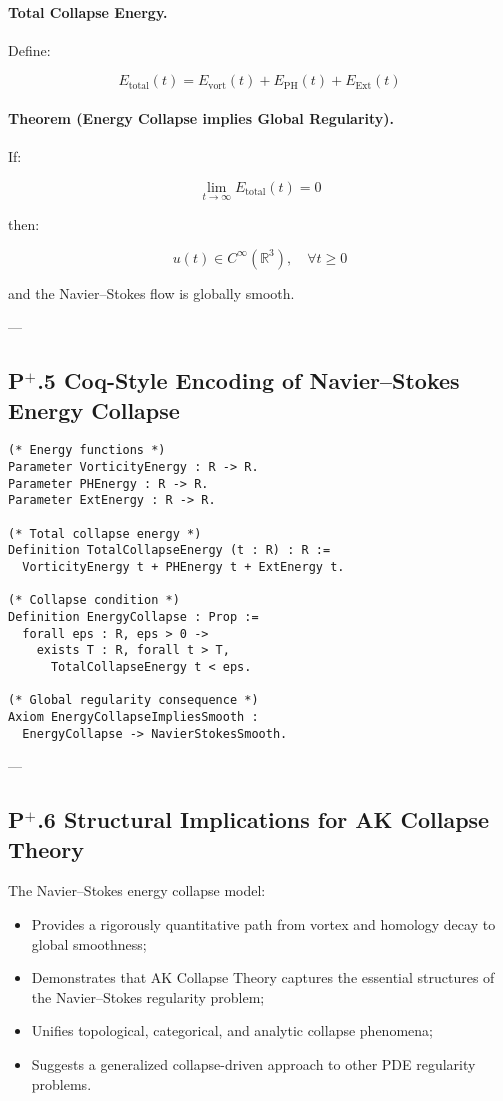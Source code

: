 \documentclass[11pt]{article}
\begin{document}
\paragraph{Total Collapse Energy.}

Define:

\[
E_{\mathrm{total}}(t) = E_{\mathrm{vort}}(t) + E_{\mathrm{PH}}(t) + E_{\mathrm{Ext}}(t)
\]

\paragraph{Theorem (Energy Collapse implies Global Regularity).}

If:

\[
\lim_{t \to \infty} E_{\mathrm{total}}(t) = 0
\]

then:

\[
u(t) \in C^\infty(\mathbb{R}^3), \quad \forall t \geq 0
\]

and the Navier–Stokes flow is globally smooth.

---

\subsection*{P$^{+}$.5 Coq-Style Encoding of Navier–Stokes Energy Collapse}

\begin{lstlisting}[language=Coq]
(* Energy functions *)
Parameter VorticityEnergy : R -> R.
Parameter PHEnergy : R -> R.
Parameter ExtEnergy : R -> R.

(* Total collapse energy *)
Definition TotalCollapseEnergy (t : R) : R :=
  VorticityEnergy t + PHEnergy t + ExtEnergy t.

(* Collapse condition *)
Definition EnergyCollapse : Prop :=
  forall eps : R, eps > 0 ->
    exists T : R, forall t > T,
      TotalCollapseEnergy t < eps.

(* Global regularity consequence *)
Axiom EnergyCollapseImpliesSmooth :
  EnergyCollapse -> NavierStokesSmooth.
\end{lstlisting}

---

\subsection*{P$^{+}$.6 Structural Implications for AK Collapse Theory}

The Navier–Stokes energy collapse model:

\begin{itemize}
    \item Provides a rigorously quantitative path from vortex and homology decay to global smoothness;
    \item Demonstrates that AK Collapse Theory captures the essential structures of the Navier–Stokes regularity problem;
    \item Unifies topological, categorical, and analytic collapse phenomena;
    \item Suggests a generalized collapse-driven approach to other PDE regularity problems.
\end{itemize}
\end{document}
